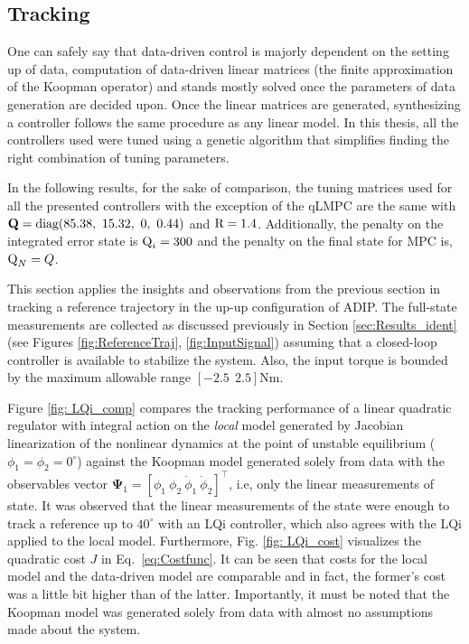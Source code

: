 \subsection{Tracking}
\label{sec:ResultsTrack}
One can safely say that data-driven control is majorly dependent on the setting up of data, computation of data-driven linear matrices (the finite approximation of the Koopman operator) and stands mostly solved once the parameters of data generation are decided upon. Once the linear matrices are generated, synthesizing a controller follows the same procedure as any linear model. In this thesis, all the controllers used were tuned using a genetic algorithm that simplifies finding the right combination of tuning parameters. \par 
In the following results, for the sake of comparison, the tuning matrices used for all the presented controllers with the exception of the qLMPC are the same with $\mathbf{Q} = \textup{diag}(85.38,~15.32,~0,~0.44)$ and $\textup{R} = 1.4$. Additionally, the penalty on the integrated error state is $\textup{Q}_i = 300$ and the penalty on the final state for MPC is, $\textup{Q}_N = Q$.\par
This section applies the insights and observations from the previous section in tracking a reference trajectory in the up-up configuration of ADIP. The full-state measurements are collected as discussed previously in Section \ref{sec:Results_ident} (see Figures \ref{fig:ReferenceTraj}, \ref{fig:InputSignal}) assuming that a closed-loop controller is available to stabilize the system. Also, the input torque is bounded by the maximum allowable range $[-2.5~~2.5]$Nm.\par
Figure \ref{fig: LQi_comp} compares the tracking performance of a linear quadratic regulator with integral action on the \textit{local} model generated by Jacobian linearization of the nonlinear dynamics at the point of unstable equilibrium ($\phi_1 = \phi_2 = 0^{\circ}$) against the Koopman model generated solely from data with the observables vector $\mathbf{\Psi}_1 = [\phi_1~\phi_2~\Dot{\phi}_1~\Dot{\phi}_2]^\top$, i.e, only the linear measurements of state. It was observed that the linear measurements of the state were enough to track a reference up to $40^{\circ}$ with an LQi controller, which also agrees with the LQi applied to the local model. Furthermore, Fig. \ref{fig: LQi_cost} visualizes the quadratic cost $J$ in Eq.~\ref{eq:Costfunc}. It can be seen that costs for the local model and the data-driven model are comparable and in fact, the former's cost was a little bit higher than of the latter. Importantly, it must be noted that the Koopman model was generated solely from data with almost no assumptions made about the system. \par
